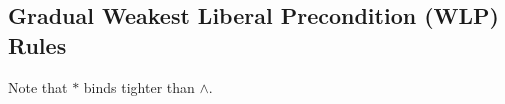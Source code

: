 
\newpage
\subsection{Gradual Weakest Liberal Precondition (WLP) Rules}



\noindent
Note that $\ast$ binds tighter than $\land$.
